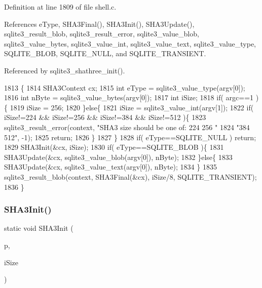 Definition at line 1809 of file shell.\+c.



References e\+Type, S\+H\+A3\+Final(), S\+H\+A3\+Init(), S\+H\+A3\+Update(), sqlite3\+\_\+result\+\_\+blob, sqlite3\+\_\+result\+\_\+error, sqlite3\+\_\+value\+\_\+blob, sqlite3\+\_\+value\+\_\+bytes, sqlite3\+\_\+value\+\_\+int, sqlite3\+\_\+value\+\_\+text, sqlite3\+\_\+value\+\_\+type, S\+Q\+L\+I\+T\+E\+\_\+\+B\+L\+OB, S\+Q\+L\+I\+T\+E\+\_\+\+N\+U\+LL, and S\+Q\+L\+I\+T\+E\+\_\+\+T\+R\+A\+N\+S\+I\+E\+NT.



Referenced by sqlite3\+\_\+shathree\+\_\+init().


\begin{DoxyCode}
1813  \{
1814   SHA3Context cx;
1815   \textcolor{keywordtype}{int} eType = sqlite3_value_type(argv[0]);
1816   \textcolor{keywordtype}{int} nByte = sqlite3_value_bytes(argv[0]);
1817   \textcolor{keywordtype}{int} iSize;
1818   \textcolor{keywordflow}{if}( argc==1 )\{
1819     iSize = 256;
1820   \}\textcolor{keywordflow}{else}\{
1821     iSize = sqlite3_value_int(argv[1]);
1822     \textcolor{keywordflow}{if}( iSize!=224 && iSize!=256 && iSize!=384 && iSize!=512 )\{
1823       sqlite3_result_error(context, \textcolor{stringliteral}{"SHA3 size should be one of: 224 256 "}
1824                                     \textcolor{stringliteral}{"384 512"}, -1);
1825       \textcolor{keywordflow}{return};
1826     \}
1827   \}
1828   \textcolor{keywordflow}{if}( eType==SQLITE_NULL ) \textcolor{keywordflow}{return};
1829   SHA3Init(&cx, iSize);
1830   \textcolor{keywordflow}{if}( eType==SQLITE_BLOB )\{
1831     SHA3Update(&cx, sqlite3_value_blob(argv[0]), nByte);
1832   \}\textcolor{keywordflow}{else}\{
1833     SHA3Update(&cx, sqlite3_value_text(argv[0]), nByte);
1834   \}
1835   sqlite3_result_blob(context, SHA3Final(&cx), iSize/8, SQLITE_TRANSIENT);
1836 \}
\end{DoxyCode}
\mbox{\label{shell_8c_ab24e75838b12ecca73c5791792e41a70}} 
\subsubsection{S\+H\+A3\+Init()}
{\footnotesize\ttfamily static void S\+H\+A3\+Init (\begin{DoxyParamCaption}\item[{\textbf{ S\+H\+A3\+Context} $\ast$}]{p,  }\item[{int}]{i\+Size }\end{DoxyParamCaption})\hspace{0.3cm}{\ttfamily [static]}}



